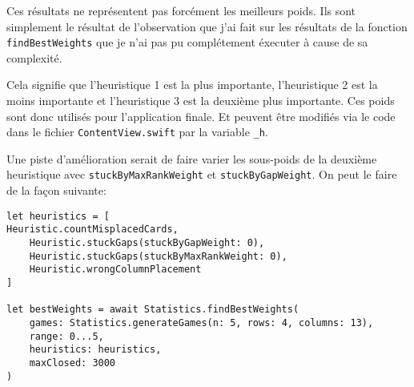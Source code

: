Ces résultats ne représentent pas forcément les meilleurs poids. Ils sont simplement le résultat de l'observation que j'ai fait sur les résultats de la fonction \texttt{findBestWeights} que je n'ai pas pu complétement éxecuter à cause de sa complexité.

Cela signifie que l'heuristique 1 est la plus importante, l'heuristique 2 est la moins importante et l'heuristique 3 est la deuxième plus importante. Ces poids sont donc utilisés pour l'application finale. Et peuvent être modifiés via le code dans le fichier \texttt{ContentView.swift} par la variable \texttt{\_h}.

\pagebreak

Une piste d'amélioration serait de faire varier les sous-poids de la deuxième heuristique avec \texttt{stuckByMaxRankWeight} et \texttt{stuckByGapWeight}. On peut le faire de la façon suivante:
\begin{lstlisting}
let heuristics = [
Heuristic.countMisplacedCards,
    Heuristic.stuckGaps(stuckByGapWeight: 0),
    Heuristic.stuckGaps(stuckByMaxRankWeight: 0),
    Heuristic.wrongColumnPlacement
]

let bestWeights = await Statistics.findBestWeights(
    games: Statistics.generateGames(n: 5, rows: 4, columns: 13),
    range: 0...5,
    heuristics: heuristics,
    maxClosed: 3000
)
\end{lstlisting}